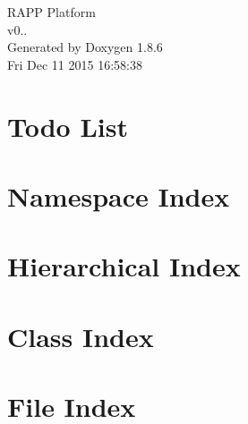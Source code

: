\documentclass[twoside]{book}
\newcommand{\clearemptydoublepage}{%
  \newpage{\pagestyle{empty}\cleardoublepage}%
}
\begin{document}
\hypersetup{pageanchor=false}
\begin{titlepage}
\vspace*{7cm}
\begin{center}%
{\Large R\-A\-P\-P Platform \\[1ex]\large v0.. }\\
\vspace*{1cm}
{\large Generated by Doxygen 1.8.6}\\
\vspace*{0.5cm}
{\small Fri Dec 11 2015 16:58:38}\\
\end{center}
\end{titlepage}
\clearemptydoublepage
\tableofcontents
\clearemptydoublepage
{}
\hypersetup{pageanchor=true}

\chapter{Todo List}
\label{todo}
\hypertarget{todo}{}

\chapter{Namespace Index}

\chapter{Hierarchical Index}

\chapter{Class Index}

\chapter{File Index}

\end{document}
